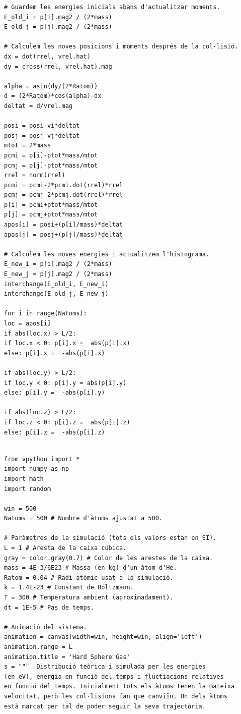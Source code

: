 \documentclass[a4paper,10.5pt]{report}
\begin{document}
\begin{appendices}
\begin{lstlisting}[caption={Simulació de la distribució d'energies i energia total del sistema en funció del temps sense implementar el termostat d'Andersen (col·lectivitat NVE, microcanònica).}]
# Guardem les energies inicials abans d'actualitzar moments.
E_old_i = p[i].mag2 / (2*mass)
E_old_j = p[j].mag2 / (2*mass)

# Calculem les noves posicions i moments després de la col·lisió.
dx = dot(rrel, vrel.hat)       
dy = cross(rrel, vrel.hat).mag 

alpha = asin(dy/(2*Ratom)) 
d = (2*Ratom)*cos(alpha)-dx 
deltat = d/vrel.mag         

posi = posi-vi*deltat 
posj = posj-vj*deltat
mtot = 2*mass
pcmi = p[i]-ptot*mass/mtot 
pcmj = p[j]-ptot*mass/mtot
rrel = norm(rrel)
pcmi = pcmi-2*pcmi.dot(rrel)*rrel 
pcmj = pcmj-2*pcmj.dot(rrel)*rrel
p[i] = pcmi+ptot*mass/mtot 
p[j] = pcmj+ptot*mass/mtot
apos[i] = posi+(p[i]/mass)*deltat 
apos[j] = posj+(p[j]/mass)*deltat

# Calculem les noves energies i actualitzem l'histograma.
E_new_i = p[i].mag2 / (2*mass)
E_new_j = p[j].mag2 / (2*mass)
interchange(E_old_i, E_new_i)
interchange(E_old_j, E_new_j)

for i in range(Natoms):
loc = apos[i]
if abs(loc.x) > L/2:
if loc.x < 0: p[i].x =  abs(p[i].x)
else: p[i].x =  -abs(p[i].x)

if abs(loc.y) > L/2:
if loc.y < 0: p[i].y = abs(p[i].y)
else: p[i].y =  -abs(p[i].y)

if abs(loc.z) > L/2:
if loc.z < 0: p[i].z =  abs(p[i].z)
else: p[i].z =  -abs(p[i].z)
	
\end{lstlisting}

\begin{lstlisting}[caption={Distribució d'energies, energia total del sistema en funció del temps i fluctuacions relatives en l'energia total amb el termostat d'Andersen implementat (col·lectivitat NVT, canònica).}]
from vpython import *
import numpy as np
import math
import random

win = 500
Natoms = 500 # Nombre d'àtoms ajustat a 500.

# Paràmetres de la simulació (tots els valors estan en SI).
L = 1 # Aresta de la caixa cúbica.
gray = color.gray(0.7) # Color de les arestes de la caixa.
mass = 4E-3/6E23 # Massa (en kg) d'un àtom d'He.
Ratom = 0.04 # Radi atòmic usat a la simulació.
k = 1.4E-23 # Constant de Boltzmann.
T = 300 # Temperatura ambient (aproximadament).
dt = 1E-5 # Pas de temps.

# Animació del sistema.
animation = canvas(width=win, height=win, align='left')
animation.range = L
animation.title = 'Hard Sphere Gas'
s = """  Distribució teòrica i simulada per les energies
(en eV), energia en funció del temps i fluctiacions relatives 
en funció del temps. Inicialment tots els àtoms tenen la mateixa
velocitat, però les col·lisions fan que canviïn. Un dels àtoms
està marcat per tal de poder seguir la seva trajectòria.


\end{lstlisting}
\end{appendices}
\end{document}
